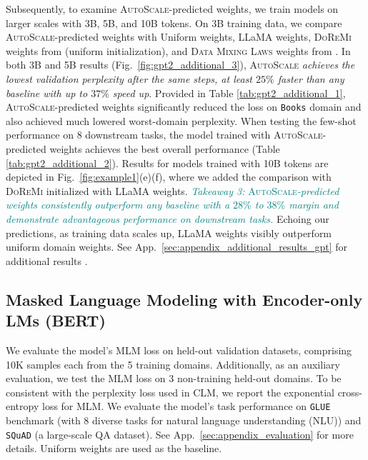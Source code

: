 \documentclass{article} %
\begin{document}
Subsequently, to examine \textsc{AutoScale}-predicted weights, we train models on larger scales with 3B, 5B, and 10B tokens. 
On 3B training data, we compare \textsc{AutoScale}-predicted weights with Uniform weights, LLaMA weights, \textsc{DoReMi} weights from \citep{fan2023doge} (uniform initialization), and \textsc{Data Mixing Laws} weights from \citep{ye2024data}. In both 3B and 5B results (Fig.~\ref{fig:gpt2_additional_3}), \textsc{AutoScale} \textit{achieves the lowest validation perplexity after the same steps, at least $25\%$ faster than any baseline with up to $37\%$ speed up}. Provided in Table \ref{tab:gpt2_additional_1}, \textsc{AutoScale}-predicted weights significantly reduced the loss on \texttt{Books} domain and also achieved much lowered worst-domain perplexity. When testing the few-shot performance on 8 downstream tasks, the model trained with \textsc{AutoScale}-predicted weights achieves the best overall performance (Table \ref{tab:gpt2_additional_2}).
Results for models trained with 10B tokens are depicted in Fig.~\ref{fig:example1}(e)(f), where we added the comparison with \textsc{DoReMi} initialized with LLaMA weights. \textcolor{teal}{\textit{Takeaway 3: }\textsc{AutoScale}\textit{-predicted weights consistently outperform any baseline with a $28\%$ to $38\%$ margin and demonstrate advantageous performance on downstream tasks. }} Echoing our predictions, as training data scales up, LLaMA weights visibly outperform uniform domain weights. See App.~\ref{sec:appendix_additional_results_gpt} for additional results .





\subsection{Masked Language Modeling with Encoder-only LMs (BERT)}
\label{sec:exp-bert}
We evaluate the model's MLM loss on held-out validation datasets, comprising 10K samples each from the 5 training domains. Additionally, as an auxiliary evaluation, we test the MLM loss on 3 non-training held-out domains. To be consistent with the perplexity loss used in CLM, we report the exponential cross-entropy loss for MLM. We evaluate the model's task performance on \texttt{GLUE} benchmark \citep{wang2018glue} (with 8 diverse tasks for natural language understanding (NLU)) and \texttt{SQuAD} \citep{rajpurkar2016squad} (a large-scale QA dataset). See App.~\ref{sec:appendix_evaluation} for more details. Uniform weights are used as the baseline.
\end{document}
